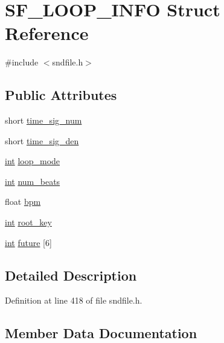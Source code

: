 \hypertarget{struct_s_f___l_o_o_p___i_n_f_o}{}\section{S\+F\+\_\+\+L\+O\+O\+P\+\_\+\+I\+N\+FO Struct Reference}
\label{struct_s_f___l_o_o_p___i_n_f_o}


{\ttfamily \#include $<$sndfile.\+h$>$}

\subsection*{Public Attributes}
\begin{DoxyCompactItemize}
\item 
short \hyperlink{struct_s_f___l_o_o_p___i_n_f_o_a6ece67f0077c22fadbc875e0250ad656}{time\+\_\+sig\+\_\+num}
\item 
short \hyperlink{struct_s_f___l_o_o_p___i_n_f_o_a0a90aff8f6d4a38e70beea2ee589df8e}{time\+\_\+sig\+\_\+den}
\item 
\hyperlink{xmltok_8h_a5a0d4a5641ce434f1d23533f2b2e6653}{int} \hyperlink{struct_s_f___l_o_o_p___i_n_f_o_a4e33720922b6aeca9e7b6dbea3c102ca}{loop\+\_\+mode}
\item 
\hyperlink{xmltok_8h_a5a0d4a5641ce434f1d23533f2b2e6653}{int} \hyperlink{struct_s_f___l_o_o_p___i_n_f_o_a5e73babc2985c7a94fc81349fb6d8e38}{num\+\_\+beats}
\item 
float \hyperlink{struct_s_f___l_o_o_p___i_n_f_o_a262bdf39e1df370c52671b5147c81924}{bpm}
\item 
\hyperlink{xmltok_8h_a5a0d4a5641ce434f1d23533f2b2e6653}{int} \hyperlink{struct_s_f___l_o_o_p___i_n_f_o_a2755451bf6c64d3c0f8202d7e427f6b8}{root\+\_\+key}
\item 
\hyperlink{xmltok_8h_a5a0d4a5641ce434f1d23533f2b2e6653}{int} \hyperlink{struct_s_f___l_o_o_p___i_n_f_o_ae6a9c7b0cb82eb362b9246a062eceb22}{future} \mbox{[}6\mbox{]}
\end{DoxyCompactItemize}


\subsection{Detailed Description}


Definition at line 418 of file sndfile.\+h.



\subsection{Member Data Documentation}
